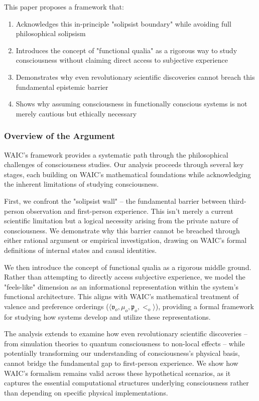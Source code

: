 \documentclass[12pt,letterpaper]{article}
\begin{document}
This paper proposes a framework that:
\begin{enumerate}
    \item Acknowledges this in-principle "solipsist boundary" while avoiding full philosophical solipsism
    \item Introduces the concept of "functional qualia" as a rigorous way to study consciousness without claiming direct access to subjective experience
    \item Demonstrates why even revolutionary scientific discoveries cannot breach this fundamental epistemic barrier
    \item Shows why assuming consciousness in functionally conscious systems is not merely cautious but ethically necessary
\end{enumerate}

\subsubsection{Overview of the Argument}

WAIC's framework provides a systematic path through the philosophical challenges of consciousness studies. Our analysis proceeds through several key stages, each building on WAIC's mathematical foundations while acknowledging the inherent limitations of studying consciousness.

First, we confront the "solipsist wall" -- the fundamental barrier between third-person observation and first-person experience. This isn't merely a current scientific limitation but a logical necessity arising from the private nature of consciousness. We demonstrate why this barrier cannot be breached through either rational argument or empirical investigation, drawing on WAIC's formal definitions of internal states and causal identities.

We then introduce the concept of functional qualia as a rigorous middle ground. Rather than attempting to directly access subjective experience, we model the "feels-like" dimension as an informational representation within the system's functional architecture. This aligns with WAIC's mathematical treatment of valence and preference orderings ($\langle\mathfrak{v}_o,\mu_o,\mathfrak{p}_o,<_o\rangle$), providing a formal framework for studying how systems develop and utilize these representations.

The analysis extends to examine how even revolutionary scientific discoveries -- from simulation theories to quantum consciousness to non-local effects -- while potentially transforming our understanding of consciousness's physical basis, cannot bridge the fundamental gap to first-person experience. We show how WAIC's formalism remains valid across these hypothetical scenarios, as it captures the essential computational structures underlying consciousness rather than depending on specific physical implementations.
\end{document}
